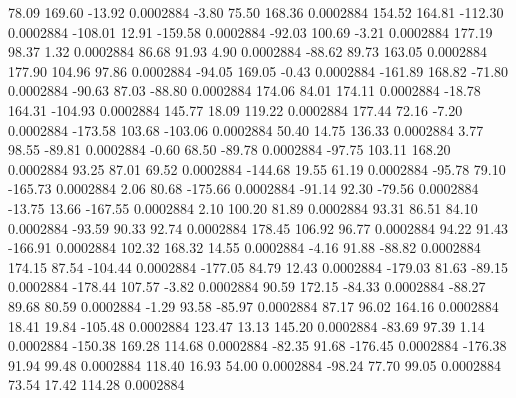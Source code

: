        78.09      169.60      -13.92     0.0002884
       -3.80       75.50      168.36     0.0002884
      154.52      164.81     -112.30     0.0002884
     -108.01       12.91     -159.58     0.0002884
      -92.03      100.69       -3.21     0.0002884
      177.19       98.37        1.32     0.0002884
       86.68       91.93        4.90     0.0002884
      -88.62       89.73      163.05     0.0002884
      177.90      104.96       97.86     0.0002884
      -94.05      169.05       -0.43     0.0002884
     -161.89      168.82      -71.80     0.0002884
      -90.63       87.03      -88.80     0.0002884
      174.06       84.01      174.11     0.0002884
      -18.78      164.31     -104.93     0.0002884
      145.77       18.09      119.22     0.0002884
      177.44       72.16       -7.20     0.0002884
     -173.58      103.68     -103.06     0.0002884
       50.40       14.75      136.33     0.0002884
        3.77       98.55      -89.81     0.0002884
       -0.60       68.50      -89.78     0.0002884
      -97.75      103.11      168.20     0.0002884
       93.25       87.01       69.52     0.0002884
     -144.68       19.55       61.19     0.0002884
      -95.78       79.10     -165.73     0.0002884
        2.06       80.68     -175.66     0.0002884
      -91.14       92.30      -79.56     0.0002884
      -13.75       13.66     -167.55     0.0002884
        2.10      100.20       81.89     0.0002884
       93.31       86.51       84.10     0.0002884
      -93.59       90.33       92.74     0.0002884
      178.45      106.92       96.77     0.0002884
       94.22       91.43     -166.91     0.0002884
      102.32      168.32       14.55     0.0002884
       -4.16       91.88      -88.82     0.0002884
      174.15       87.54     -104.44     0.0002884
     -177.05       84.79       12.43     0.0002884
     -179.03       81.63      -89.15     0.0002884
     -178.44      107.57       -3.82     0.0002884
       90.59      172.15      -84.33     0.0002884
      -88.27       89.68       80.59     0.0002884
       -1.29       93.58      -85.97     0.0002884
       87.17       96.02      164.16     0.0002884
       18.41       19.84     -105.48     0.0002884
      123.47       13.13      145.20     0.0002884
      -83.69       97.39        1.14     0.0002884
     -150.38      169.28      114.68     0.0002884
      -82.35       91.68     -176.45     0.0002884
     -176.38       91.94       99.48     0.0002884
      118.40       16.93       54.00     0.0002884
      -98.24       77.70       99.05     0.0002884
       73.54       17.42      114.28     0.0002884
